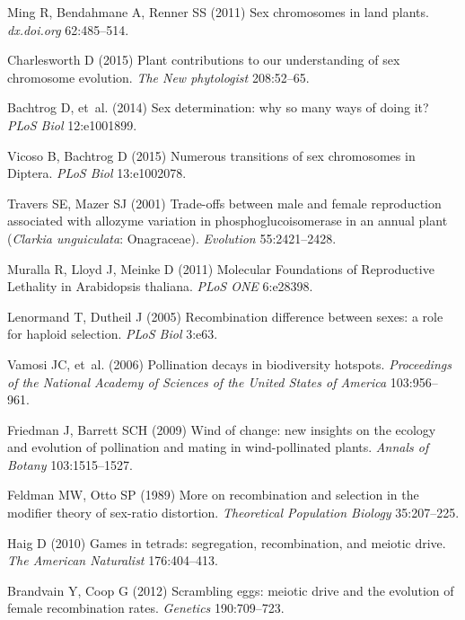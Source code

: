 \begin{thebibliography}{20}
Ming R, Bendahmane A, Renner SS
 (2011) {Sex chromosomes in land plants}.
 \textit{dx.doi.org} 62:485--514.

Charlesworth D
 (2015) {Plant contributions to our understanding of sex chromosome
  evolution}.
 \textit{The New phytologist} 208:52--65.

Bachtrog D, {et~al.}
 (2014) {Sex determination: why so many ways of doing it?}
 \textit{PLoS Biol} 12:e1001899.

Vicoso B, Bachtrog D
 (2015) {Numerous transitions of sex chromosomes in Diptera.}
 \textit{PLoS Biol} 13:e1002078.

Travers SE, Mazer SJ
 (2001) {Trade-offs between male and female reproduction associated
  with allozyme variation in phosphoglucoisomerase in an annual plant
  (\textit{Clarkia unguiculata}: Onagraceae).}
 \textit{Evolution} 55:2421--2428.

Muralla R, Lloyd J, Meinke D
 (2011) {Molecular Foundations of Reproductive Lethality in
  Arabidopsis thaliana}.
 \textit{PLoS ONE} 6:e28398.

Lenormand T, Dutheil J
 (2005) {Recombination difference between sexes: a role for haploid
  selection}.
 \textit{PLoS Biol} 3:e63.

Vamosi JC, {et~al.}
 (2006) {Pollination decays in biodiversity hotspots.}
 \textit{Proceedings of the National Academy of Sciences of the United
  States of America} 103:956--961.

Friedman J, Barrett SCH
 (2009) {Wind of change: new insights on the ecology and evolution of
  pollination and mating in wind-pollinated plants}.
 \textit{Annals of Botany} 103:1515--1527.

Feldman MW, Otto SP
 (1989) {More on recombination and selection in the modifier theory of
  sex-ratio distortion}.
 \textit{Theoretical Population Biology} 35:207--225.

Haig D
 (2010) {Games in tetrads: segregation, recombination, and meiotic
  drive.}
 \textit{The American Naturalist} 176:404--413.

Brandvain Y, Coop G
 (2012) {Scrambling eggs: meiotic drive and the evolution of female
  recombination rates}.
 \textit{Genetics} 190:709--723.


\end{thebibliography}
